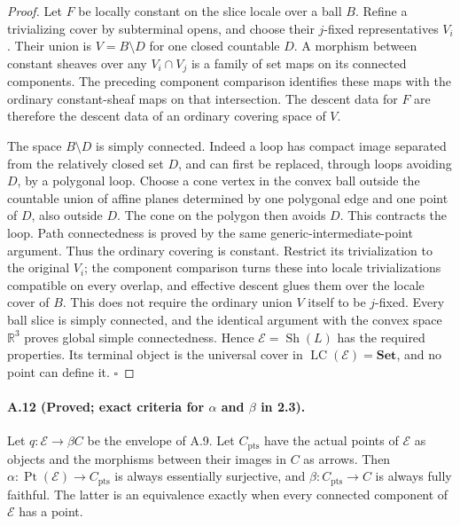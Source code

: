 \begin{proof}
Let $F$ be locally constant on the slice locale over a ball $B$. Refine a trivializing cover by subterminal opens, and choose their $j$-fixed representatives $V_i$. Their union is $V=B\setminus D$ for one closed countable $D$. A morphism between constant sheaves over any $V_i\cap V_j$ is a family of set maps on its connected components. The preceding component comparison identifies these maps with the ordinary constant-sheaf maps on that intersection. The descent data for $F$ are therefore the descent data of an ordinary covering space of $V$.

The space $B\setminus D$ is simply connected. Indeed a loop has compact image separated from the relatively closed set $D$, and can first be replaced, through loops avoiding $D$, by a polygonal loop. Choose a cone vertex in the convex ball outside the countable union of affine planes determined by one polygonal edge and one point of $D$, also outside $D$. The cone on the polygon then avoids $D$. This contracts the loop. Path connectedness is proved by the same generic-intermediate-point argument. Thus the ordinary covering is constant. Restrict its trivialization to the original $V_i$; the component comparison turns these into locale trivializations compatible on every overlap, and effective descent glues them over the locale cover of $B$. This does not require the ordinary union $V$ itself to be $j$-fixed. Every ball slice is simply connected, and the identical argument with the convex space $\mathbb R^3$ proves global simple connectedness. Hence $\mathcal E=\operatorname{Sh}(L)$ has the required properties. Its terminal object is the universal cover in $\operatorname{LC}(\mathcal E)=\mathbf{Set}$, and no point can define it. \hfill$\square$
\end{proof}

\paragraph{A.12 (Proved; exact criteria for $\alpha$ and $\beta$ in 2.3).}
Let $q:\mathcal E\to\beta C$ be the envelope of A.9. Let $C_{\mathrm{pts}}$ have the actual points of $\mathcal E$ as objects and the morphisms between their images in $C$ as arrows. Then $\alpha:\operatorname{Pt}(\mathcal E)\to C_{\mathrm{pts}}$ is always essentially surjective, and $\beta:C_{\mathrm{pts}}\to C$ is always fully faithful. The latter is an equivalence exactly when every connected component of $\mathcal E$ has a point.

